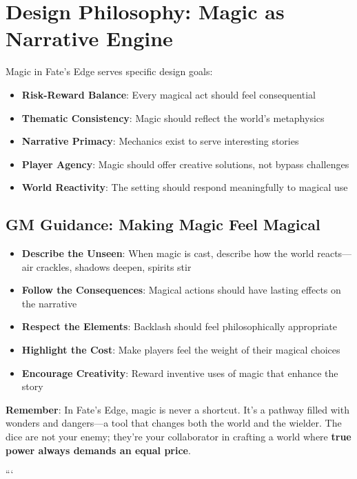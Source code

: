\section*{Design Philosophy: Magic as Narrative Engine}

Magic in Fate's Edge serves specific design goals:

\begin{itemize}
    \item \textbf{Risk-Reward Balance}: Every magical act should feel consequential
    \item \textbf{Thematic Consistency}: Magic should reflect the world's metaphysics
    \item \textbf{Narrative Primacy}: Mechanics exist to serve interesting stories
    \item \textbf{Player Agency}: Magic should offer creative solutions, not bypass challenges
    \item \textbf{World Reactivity}: The setting should respond meaningfully to magical use
\end{itemize}

\subsection*{GM Guidance: Making Magic Feel Magical}

\begin{itemize}
    \item \textbf{Describe the Unseen}: When magic is cast, describe how the world reacts—air crackles, shadows deepen, spirits stir
    \item \textbf{Follow the Consequences}: Magical actions should have lasting effects on the narrative
    \item \textbf{Respect the Elements}: Backlash should feel philosophically appropriate
    \item \textbf{Highlight the Cost}: Make players feel the weight of their magical choices
    \item \textbf{Encourage Creativity}: Reward inventive uses of magic that enhance the story
\end{itemize}

\textbf{Remember}: In Fate's Edge, magic is never a shortcut. It's a pathway filled with wonders and dangers—a tool that changes both the world and the wielder. The dice are not your enemy; they're your collaborator in crafting a world where \textbf{true power always demands an equal price}.


```